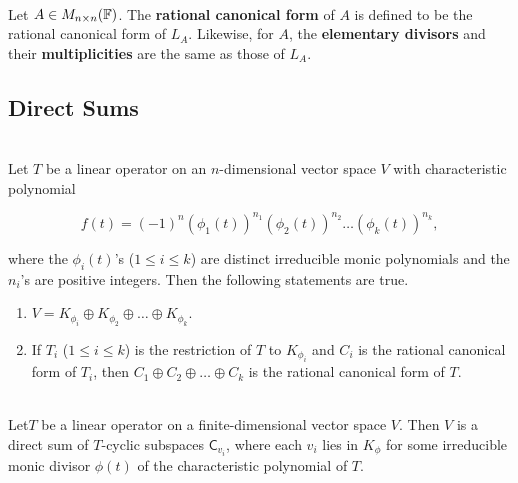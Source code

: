 \begin{definition}
	\hfill\\
	Let $A \in M_{n \times n}(\mathbb{F})$. The \textbf{rational canonical form} of $A$ is defined to be the rational canonical form of $L_A$. Likewise, for $A$, the \textbf{elementary divisors} and their \textbf{multiplicities} are the same as those of $L_A$.
\end{definition}

\subsection*{Direct Sums}

\begin{theorem}
	\hfill\\
	Let $T$ be a linear operator on an $n$-dimensional vector space $V$ with characteristic polynomial

	\[f(t) = (-1)^n(\phi_1(t))^{n_1} (\phi_2(t))^{n_2} \dots (\phi_k(t))^{n_k},\]

	where the $\phi_i(t)$'s ($1 \leq i \leq k$) are distinct irreducible monic polynomials and the $n_i$'s are positive integers. Then the following statements are true.

	\begin{enumerate}
		\item $V = K_{\phi_i} \oplus K_{\phi_2} \oplus \dots \oplus K_{\phi_k}$.
		\item If $T_i$ ($1 \leq i \leq k$) is the restriction of $T$ to $K_{\phi_i}$ and $C_i$ is the rational canonical form of $T_i$, then $C_1 \oplus C_2 \oplus \dots \oplus C_k$ is the rational canonical form of $T$.
	\end{enumerate}
\end{theorem}

\begin{theorem}
	\hfill\\
	Let$T$ be a linear operator on a finite-dimensional vector space $V$. Then $V$ is a direct sum of $T$-cyclic subspaces $\mathsf{C}_{v_i}$, where each $v_i$ lies in $K_\phi$ for some irreducible monic divisor $\phi(t)$ of the characteristic polynomial of $T$.
\end{theorem}
